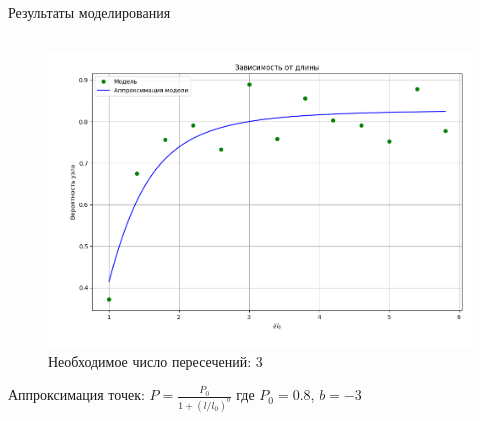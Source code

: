 \begin{frame}{Результаты моделирования}
\begin{columns}
		\begin{column}{0.5\linewidth}
			\begin{figure}[H]
				\includegraphics[width=1\linewidth]{img/model_1.png}
				Необходимое число пересечений: 3
			\end{figure}
			Аппроксимация точек:
			$P = \frac{P_0}{1+(l/l_0)^b}$
			где $P_0 = 0.8$, $b = -3$
		\end{column}


%
%
%

	\end{columns}

\end{frame}

